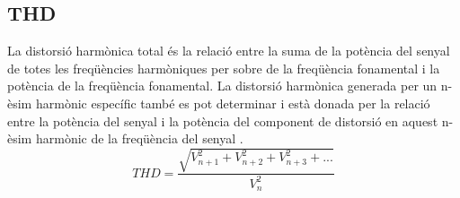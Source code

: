 \subsection{THD}
\par La distorsió harmònica total és la relació entre la suma de la potència del senyal de totes les freqüències harmòniques per sobre de la freqüència fonamental i la potència de la freqüència fonamental. La distorsió harmònica generada per un n-èsim harmònic específic també es pot determinar i està donada per la relació entre la potència del senyal i la potència del component de distorsió en aquest n-èsim harmònic de la freqüència del senyal \cite{PiquePWR}.
\begin{equation}
    THD = \frac{\sqrt{V_{n+1}^{2}+V_{n+2}^{2}+V_{n+3}^{2}+...}}{V_{n}^{2}}
\end{equation}

